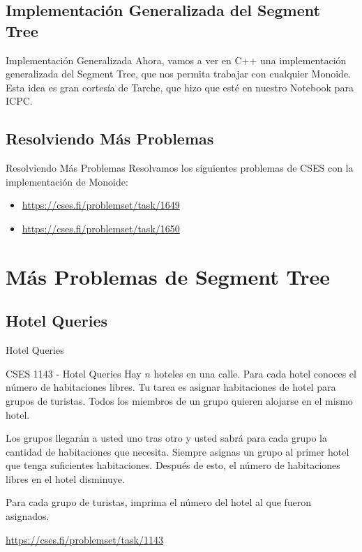 \documentclass{beamer}
\begin{document}
\subsection{Implementación Generalizada del Segment Tree}

\begin{frame}{Implementación Generalizada}
Ahora, vamos a ver en C++ una implementación generalizada del Segment Tree, que nos permita trabajar con cualquier Monoide. Esta idea es gran cortesía de Tarche, que hizo que esté en nuestro Notebook para ICPC.
\end{frame}

\subsection{Resolviendo Más Problemas}
\begin{frame}{Resolviendo Más Problemas}
Resolvamos los siguientes problemas de CSES con la implementación de Monoide:
\begin{itemize}
    \item \url{https://cses.fi/problemset/task/1649}
    \item \url{https://cses.fi/problemset/task/1650}
\end{itemize}
\end{frame}

\section{Más Problemas de Segment Tree}

\subsection{Hotel Queries}

\begin{frame}{Hotel Queries}
\begin{block}{CSES 1143 - Hotel Queries}
Hay $n$ hoteles en una calle. Para cada hotel conoces el número de habitaciones libres. Tu tarea es asignar habitaciones de hotel para grupos de turistas. Todos los miembros de un grupo quieren alojarse en el mismo hotel.

Los grupos llegarán a usted uno tras otro y usted sabrá para cada grupo la cantidad de habitaciones que necesita. Siempre asignas un grupo al primer hotel que tenga suficientes habitaciones. Después de esto, el número de habitaciones libres en el hotel disminuye.

Para cada grupo de turistas, imprima el número del hotel al que fueron asignados.
\end{block}

\url{https://cses.fi/problemset/task/1143}
\end{frame}
\end{document}

